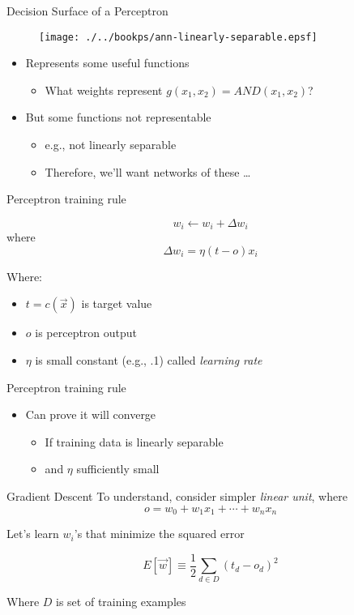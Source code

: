 \documentclass[%
pdf,
colorBG,
slideColor,
tcrico,
]{prosper}
\begin{document}
\begin{slide}{  Decision Surface of a Perceptron  } 
\begin{figure}
	\centering
	\texttt{[image: ./../bookps/ann-linearly-separable.epsf]}
\end{figure}

\tiny
\begin{itemize}
 \item  Represents some useful functions
	\begin{itemize} \item What weights represent $g(x_{1},x_{2}) = AND(x_{1},x_{2})$? \end{itemize}
\item But some functions not representable
	\begin{itemize} \item e.g., not linearly separable 
	\item Therefore, we'll want networks of these \dots
	\end{itemize}
\end{itemize}
\end{slide}



\begin{slide}{  Perceptron training rule  } 

\[w_i \leftarrow w_i + \Delta w_i \]
where
\[ \Delta w_{i} = \eta (t - o) x_{i} \]

Where:
\begin{itemize}
\item $t=c(\vec{x})$ is target value
\item $o$ is perceptron output
\item $\eta$ is small constant (e.g., .1) called {\em learning rate}
\end{itemize}
\end{slide}


\begin{slide}{  Perceptron training rule  } 
\begin{itemize}
\item Can prove it will converge
	\begin{itemize}
	\item If training data is linearly separable
	\item and $\eta$ sufficiently small
	\end{itemize}
\end{itemize}
\end{slide}

\begin{slide}{  Gradient Descent  } 
To understand, consider simpler {\em linear unit}, where
\[ o = w_{0} + w_{1}x_1 + \cdots + w_n x_n \]

Let's learn $w_{i}$'s that minimize the squared error

\[ E[\vec{w}] \equiv  \frac{1}{2}\sum_{d \in D}(t_{d} - o_{d})^{2} \]

Where $D$ is set of training examples
\end{slide}
\end{document}
